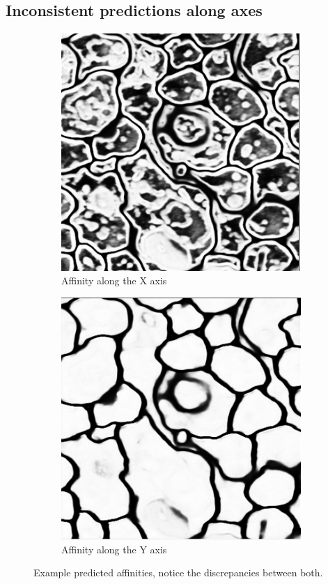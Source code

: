 \subsection{Inconsistent predictions along axes}
\begin{figure}[!htbp]
    \centering
    \begin{subfigure}[t]{0.40\textwidth}
        \centering
        \includegraphics[height=0.9\textwidth]{./images/x_axis.png}
        \caption{Affinity along the X axis}
    \end{subfigure}%
    \begin{subfigure}[t]{0.40\textwidth}
        \centering
        \includegraphics[height=0.9\textwidth]{./images/y_axis.png}
        \caption{Affinity along the Y axis}
    \end{subfigure}
	\caption{Example predicted affinities, notice the discrepancies between
	both.}
	\label{fig:affinity}
\end{figure}

